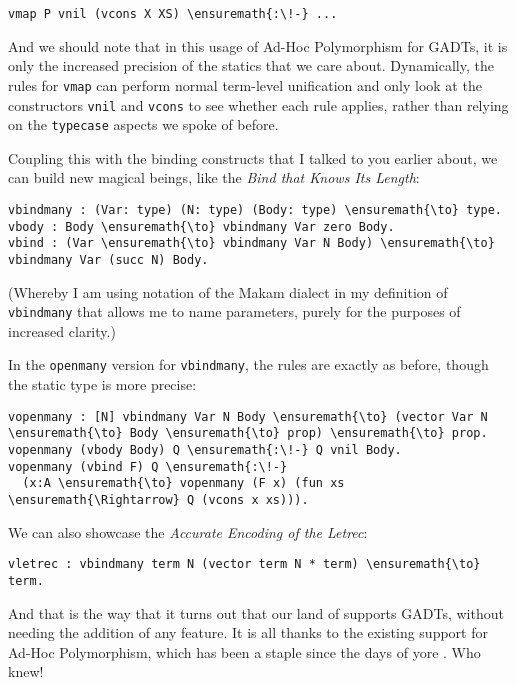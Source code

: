 \begin{verbatim}
vmap P vnil (vcons X XS) \ensuremath{:\!-} ...
\end{verbatim}

And we should note that in this usage of Ad-Hoc Polymorphism for GADTs,
it is only the increased precision of the statics that we care about.
Dynamically, the rules for \texttt{vmap} can perform normal term-level
unification and only look at the constructors \texttt{vnil} and
\texttt{vcons} to see whether each rule applies, rather than relying on
the \texttt{typecase} aspects we spoke of before.

Coupling this with the binding constructs that I talked to you earlier
about, we can build new magical beings, like the \emph{Bind that Knows
Its Length}:

\importantCodeblock{}

\begin{verbatim}
vbindmany : (Var: type) (N: type) (Body: type) \ensuremath{\to} type.
vbody : Body \ensuremath{\to} vbindmany Var zero Body.
vbind : (Var \ensuremath{\to} vbindmany Var N Body) \ensuremath{\to} vbindmany Var (succ N) Body.
\end{verbatim}

\importantCodeblockEnd{}

(Whereby I am using notation of the Makam dialect in my definition of
\texttt{vbindmany} that allows me to name parameters, purely for the
purposes of increased clarity.)

In the \texttt{openmany} version for \texttt{vbindmany}, the rules are
exactly as before, though the static type is more precise:

\begin{verbatim}
vopenmany : [N] vbindmany Var N Body \ensuremath{\to} (vector Var N \ensuremath{\to} Body \ensuremath{\to} prop) \ensuremath{\to} prop.
vopenmany (vbody Body) Q \ensuremath{:\!-} Q vnil Body.
vopenmany (vbind F) Q \ensuremath{:\!-}
  (x:A \ensuremath{\to} vopenmany (F x) (fun xs \ensuremath{\Rightarrow} Q (vcons x xs))).
\end{verbatim}

We can also showcase the \emph{Accurate Encoding of the Letrec}:

\importantCodeblock{}

\begin{verbatim}
vletrec : vbindmany term N (vector term N * term) \ensuremath{\to} term.
\end{verbatim}

\importantCodeblockEnd{}

And that is the way that it turns out that our land of
\lamprolog supports GADTs, without needing the addition of any feature.
It is all thanks to the existing support for Ad-Hoc Polymorphism, which
has been a staple since the days of yore
\citep{lambdaprolog-early-reference}. Who knew!

\identDialog
